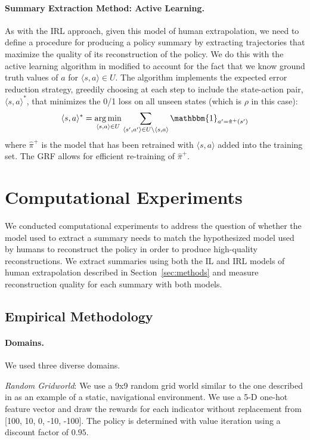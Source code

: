\documentclass{article}
\DeclareMathOperator*{\argmin}{arg\,min}
\begin{document}
\paragraph{Summary Extraction Method: Active Learning.}
As with the IRL approach, given this model of human extrapolation, we need to define a procedure for producing a policy summary by extracting trajectories that maximize the quality of its reconstruction of the policy. We do this with the active learning algorithm in \cite{zhu2003} modified to account for the fact that we know ground truth values of $a$ for ${\langle s , a \rangle \in U}$. The algorithm implements the expected error reduction strategy, greedily choosing at each step to include the state-action pair, $\langle s , a \rangle^*$, that minimizes the 0/1 loss on all unseen states (which is $\rho$ in this case):
\begin{equation}\label{eq_ALloss}
\langle s , a \rangle^* = \argmin_{\langle s , a \rangle \in U} \sum_{\langle s' , a' \rangle \in U \setminus \langle s , a \rangle} \mathbbm{1}_{a' = \hat{\pi}^+(s')}
\end{equation}
where $\hat{\pi}^+$ is the model that has been retrained with $\langle s , a \rangle$ added into the training set. The GRF allows for efficient re-training of $\hat{\pi}^+$. 

\section{Computational Experiments}
We conducted computational experiments to address the question of whether the model used to extract a summary needs to match the hypothesized model used by humans to reconstruct the policy in order  to produce high-quality reconstructions.
We extract summaries using both the IL and IRL models of human extrapolation described in Section~\ref{sec:methods} 
and measure reconstruction quality for each summary with both models.

\subsection{Empirical Methodology}

\paragraph{Domains.}
We used three diverse domains.

\textit{Random Gridworld}: We use a 9x9 random grid world similar to the one described in \cite{brown2018machineteachingirl} as an example of a static, navigational environment. 
We use a 5-D one-hot feature vector and draw the rewards for each indicator without replacement from [100, 10, 0, -10, -100]. The policy is determined with value iteration using a discount factor of $0.95$. 
\end{document}
